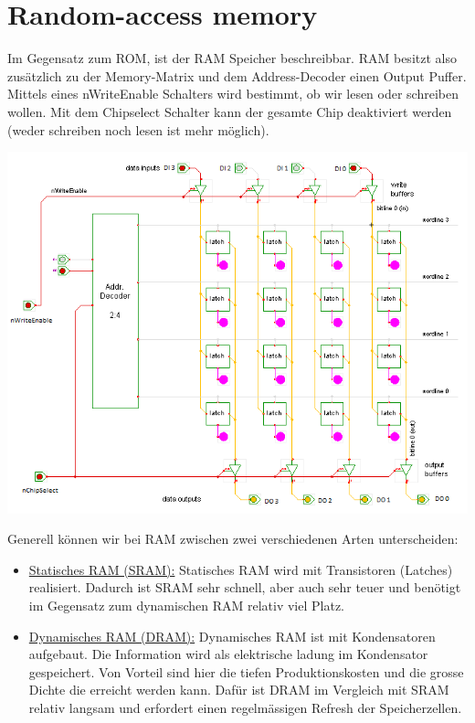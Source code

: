 \documentclass[a4paper,10pt]{report}
\begin{document}
\section{Random-access memory}
Im Gegensatz zum ROM, ist der RAM Speicher beschreibbar. RAM besitzt also zusätzlich zu der Memory-Matrix und dem Address-Decoder einen Output Puffer. Mittels eines nWriteEnable Schalters wird bestimmt, ob wir lesen oder schreiben wollen. Mit dem Chipselect Schalter kann der gesamte Chip deaktiviert werden (weder schreiben noch lesen ist mehr möglich).
\begin{center}
\includegraphics[scale=0.85]{imgs/RAM.png}
\end{center}
Generell können wir bei RAM zwischen zwei verschiedenen Arten unterscheiden: 
\begin{itemize}
	\item \underline{Statisches RAM (SRAM):} Statisches RAM wird mit Transistoren (Latches) realisiert. Dadurch ist SRAM sehr schnell, aber auch sehr teuer und benötigt im Gegensatz zum dynamischen RAM relativ viel Platz.
	\item \underline{Dynamisches RAM (DRAM):} Dynamisches RAM ist mit Kondensatoren aufgebaut. Die Information wird als elektrische ladung im Kondensator gespeichert. Von Vorteil sind hier die tiefen Produktionskosten und die grosse Dichte die erreicht werden kann. Dafür ist DRAM im Vergleich mit SRAM relativ langsam und erfordert einen regelmässigen Refresh der Speicherzellen.
\end{itemize}
\end{document}
